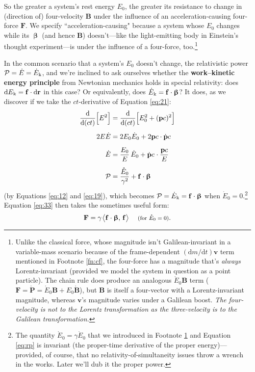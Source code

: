 \documentclass[12pt]{article}
\renewcommand{\vv}[1]{\mathbf{#1}}
\newcommand{\dd}[1]{\mathrm{d}#1}
\newcommand{\vvbeta}{\bm{\upbeta}}
\begin{document}
So the greater a system's rest energy $E_0$, the greater its resistance to change in (direction of) four-velocity $\vv B$ under the influence of an acceleration-causing four-force $\vv F$. We specify ``acceleration-causing" because a system whose $E_0$ changes while its $\vvbeta$ (and hence $\vv B$) doesn't---like the light-emitting body in Einstein's thought experiment---is under the influence of a four-force, too.\footnote{\label{fn:fo}Unlike the classical force, whose magnitude isn't Galilean-invariant in a variable-mass scenario because of the frame-dependent $(\dd m / \dd t) \vv v$ term mentioned in Footnote \ref{fn:cf}, the four-force has a magnitude that's \emph{always} Lorentz-invariant (provided we model the system in question as a point particle). The chain rule does produce an analogous $\mathring{E}_0 \vv B$ term ($\vv F = \mathring{\vv P} = \mathring{E}_0 \vv B + E_0 \mathring{\vv B}$), but $\vv B$ is itself a four-vector with a Lorentz-invariant magnitude, whereas $\vv v$'s magnitude varies under a Galilean boost. \emph{The four-velocity is \emph{not} to the Lorentz transformation as the three-velocity is to the Galilean transformation.}}

In the common scenario that a system's $E_0$ doesn't change, the relativistic power $\mathcal{P} = \dot{E} = \dot{E}_{\mkern.5mu \textrm{k}}$, and we're inclined to ask ourselves whether the \textbf{work--kinetic energy principle} from Newtonian mechanics holds in special relativity: does $\dd E_{\mkern.5mu \textrm{k}} = \vv f \cdot \dd \vv r$ in this case? Or equivalently, does $\dot{E}_{\mkern.5mu \textrm{k}} = \vv f \cdot \vvbeta$? It does, as we discover if we take the $ct$-derivative of Equation \ref{eq:21}:
\begin{equation}\label{eq:rp}
\begin{split}
\frac{\dd}{\dd (ct)} \Big[ E^2 \Big] &= \frac{\dd}{\dd (ct)} \Big[ E_0^2 + (\vv p c)^2 \Big] \\[5pt]
2E \dot{E} &= 2 E_0 \dot{E}_0 + 2 \vv p c \cdot \dot{\vv p} c\\[5pt]
\dot{E} &= \dfrac{E_0}{E} \, \dot{E}_0 + \dot{\vv p} c \mkern1mu \cdot \dfrac{\vv p c}{E} \\[5pt]
\mathcal{P} &= \dfrac{\mathring{E}_0}{\gamma^2} + \vv f \cdot \vvbeta
\end{split}
\end{equation}
(by Equations \ref{eq:12} and \ref{eq:19}), which becomes $\mathcal{P} = \dot{E}_{\mkern.5mu \textrm{k}} = \vv f \cdot \vvbeta$ when $\dot{E}_0 = 0$.\footnote{The quantity $\mathring{E}_0 = \gamma \dot{E}_0$ that we introduced in Footnote \ref{fn:fo} and Equation \ref{eq:rp} is invariant (the proper-time derivative of the proper energy)---provided, of course, that no relativity-of-simultaneity issues throw a wrench in the works. Later we'll dub it the proper power.} Equation \ref{eq:33} then takes the sometimes useful form:
\begin{equation}\label{eq:fb}
\vv F = \gamma \mkern1.5mu \big \langle \vv f \cdot \vvbeta, \, \vv f \big \rangle \quad \textrm{\footnotesize{ (for $\mathring{E}_0 = 0$)}}.
\end{equation}
\end{document}
